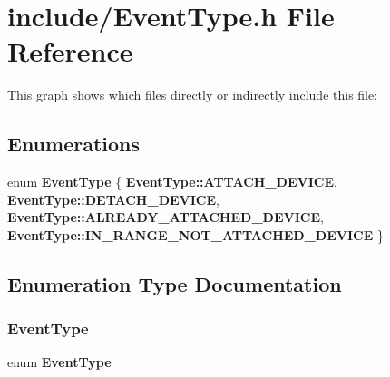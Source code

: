 \section{include/\+Event\+Type.h File Reference}
\label{_event_type_8h}
This graph shows which files directly or indirectly include this file\+:
\subsection*{Enumerations}
\begin{DoxyCompactItemize}
\item 
enum \textbf{ Event\+Type} \{ \textbf{ Event\+Type\+::\+A\+T\+T\+A\+C\+H\+\_\+\+D\+E\+V\+I\+CE}, 
\textbf{ Event\+Type\+::\+D\+E\+T\+A\+C\+H\+\_\+\+D\+E\+V\+I\+CE}, 
\textbf{ Event\+Type\+::\+A\+L\+R\+E\+A\+D\+Y\+\_\+\+A\+T\+T\+A\+C\+H\+E\+D\+\_\+\+D\+E\+V\+I\+CE}, 
\textbf{ Event\+Type\+::\+I\+N\+\_\+\+R\+A\+N\+G\+E\+\_\+\+N\+O\+T\+\_\+\+A\+T\+T\+A\+C\+H\+E\+D\+\_\+\+D\+E\+V\+I\+CE}
 \}
\end{DoxyCompactItemize}


\subsection{Enumeration Type Documentation}
\mbox{\label{_event_type_8h_a2628ea8d12e8b2563c32f05dc7fff6fa}} 
\subsubsection{Event\+Type}
{\footnotesize\ttfamily enum \textbf{ Event\+Type}\hspace{0.3cm}{\ttfamily [strong]}}

